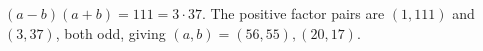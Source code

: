 $(a-b)(a+b)=111=3\cdot37 $. The positive factor pairs are $(1,111)$ and $(3,37)$, both odd, giving $\boxed{(a,b)=(56,55),(20,17)}$.
